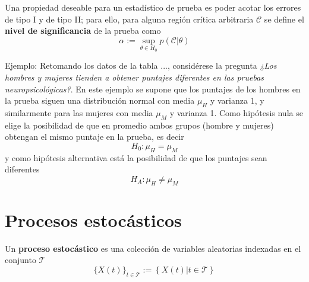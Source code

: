 Una propiedad deseable para un estadístico de prueba es poder acotar los errores de tipo I y de tipo II; para ello, para alguna región crítica arbitraria $\mathcal{C}$ se define el \textbf{nivel de significancia} de la prueba como
\begin{equation}
\alpha := \sup_{\theta \in H_0} p(\mathcal{C} \lvert \theta)
\end{equation}

Ejemplo:
Retomando los datos de la tabla ..., considérese la pregunta \textit{¿Los hombres y mujeres tienden
a obtener puntajes diferentes en las pruebas neuropsicológicas?}. 
%
En este ejemplo se supone que los puntajes de los hombres en la prueba siguen una distribución normal con media $\mu_H$ y varianza 1, y similarmente para las mujeres con media $\mu_M$ y varianza 1.
%
Como hipótesis nula se elige la posibilidad de que en promedio ambos grupos (hombre y mujeres) obtengan el mismo puntaje en la prueba, es decir
\begin{equation}
H_0 : \mu_H = \mu_M
\end{equation}
y como hipótesis alternativa está la posibilidad de que los puntajes sean diferentes
\begin{equation}
H_A : \mu_H \neq \mu_M
\end{equation}

%


\section{Procesos estocásticos}

\begin{definicion}
Un \textbf{proceso estocástico} \xt es una colección de variables aleatorias indexadas en el 
conjunto $\mathcal{T}$
\begin{equation}
\{X(t)\}_{t\in \mathcal{T}} := \left\{ X(t) \lvert t\in \mathcal{T} \right\}
\end{equation}
\end{definicion}

